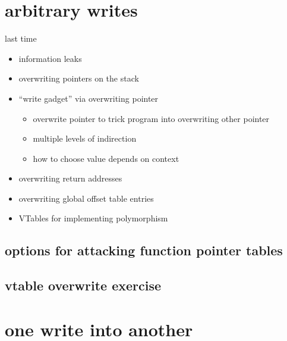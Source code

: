 \date{}
\title{}
\date{}

\begin{frame}
    \titlepage
\end{frame}


\section{arbitrary writes}


\begin{frame}{last time}
    \begin{itemize}
    \item information leaks
    \item overwriting pointers on the stack
    \item ``write gadget'' via overwriting pointer
        \begin{itemize}
        \item overwrite pointer to trick program into overwriting other pointer
        \item multiple levels of indirection
        \item how to choose value depends on context
        \end{itemize}
    \item overwriting return addresses
    \item overwriting global offset table entries
    \item VTables for implementing polymorphism
    \end{itemize}
\end{frame}

\subsection{options for attacking function pointer tables}


\subsection{vtable overwrite exercise}





\section{one write into another}


